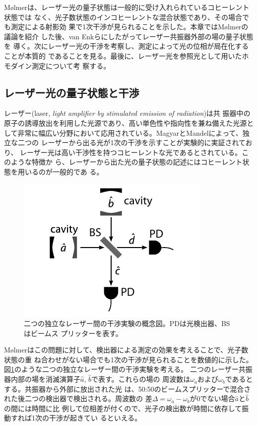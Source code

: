 \documentclass[11pt]{jsarticle}
\newcommand{\ope}[1]{\hat{#1}}
\begin{document}
M{\o}lmerは、レーザー光の量子状態は一般的に受け入れられているコヒーレント状態では
なく、光子数状態のインコヒーレントな混合状態であり、その場合でも測定による射影効
果で1次干渉が見られることを示した\cite{Molmer1997}。本章ではM{\o}lmerの議論を紹介
した後、van Enkら\cite{vanEnk2002}にしたがってレーザー共振器外部の場の量子状態を
導く。次にレーザー光の干渉を考察し、測定によって光の位相が局在化することが本質的
であることを見る。最後に、レーザー光を参照光として用いたホモダイン測定について考
察する。

\subsection{レーザー光の量子状態と干渉}
\label{sec:molmer-interference}

レーザー(laser, \textit{light amplifier by stimulated emission of radiation})は共
振器中の原子の誘導放出を利用した光源であり、高い単色性や指向性を兼ね備えた光源と
して非常に幅広い分野において応用されている。MagyarとMandelによって、独立な二つの
レーザーから出る光が1次の干渉を示すことが実験的に実証されており\cite{Magyar1963}、
レーザー光は高い干渉性を持つコヒーレントな光であるとされている。このような特徴か
ら、レーザーから出た光の量子状態の記述にはコヒーレント状態を用いるのが一般的であ
る。

\begin{figure}[htbp]
  \centering
  \includegraphics{molmer-interference.pdf}
  \caption{二つの独立なレーザー間の干渉実験の概念図。PDは光検出器、BSはビームス
    プリッターを表す。}
  \label{fig:indep-interference}
\end{figure}

M{\o}lmerはこの問題に対して、検出器による測定の効果を考えることで、光子数状態の重
ね合わせがない場合でも1次の干渉が見られることを数値的に示した\cite{Molmer1997}。
図\ref{fig:indep-interference}のような二つの独立なレーザー間の干渉実験を考える。
二つのレーザー共振器内部の場を消滅演算子$\ope{a}$, $\ope{b}$で表す。これらの場の
周波数は$\omega_a$および$\omega_b$であるとする。共振器から外部に放出された光
は、50:50のビームスプリッターで混合された後二つの検出器で検出される。周波数の
差$\Delta = \omega_a - \omega_b$が0でない場合$\ope{a}$と$\ope{b}$の間には時間に比
例して位相差が付くので、光子の検出数が時間に依存して振動すれば1次の干渉が起きてい
るといえる。
\end{document}
